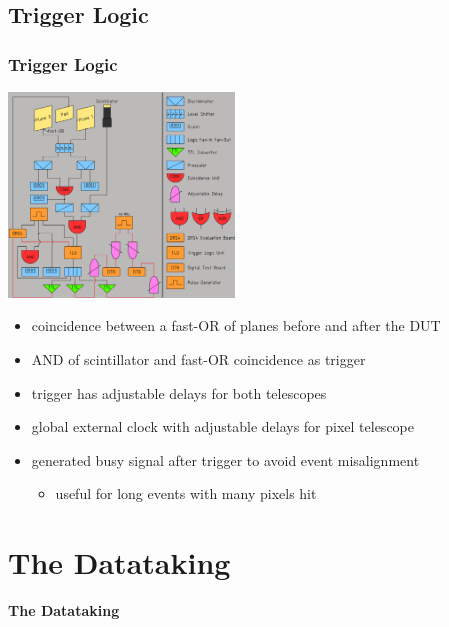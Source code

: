 \documentclass[9pt]{beamer}
\begin{document}
\subsection{Trigger Logic}
\begin{frame}
	\frametitle{Trigger Logic}
	\begin{center}
		\begin{minipage}{6cm}
			\centering
			\includegraphics[width=6cm]{Pics/triglog2}
		\end{minipage}
		\hspace*{2pt}
		\begin{minipage}{5cm}
			\begin{itemize}
				\item coincidence between a fast-OR of planes before and after the DUT
				\item AND of scintillator and fast-OR coincidence as trigger
				\item trigger has adjustable delays for both telescopes
				\item global external clock with adjustable delays for pixel telescope
				\item generated busy signal after trigger to avoid event misalignment
				\begin{itemize}
					\item useful for long events with many pixels hit 
				\end{itemize}
			\end{itemize}
		\end{minipage}\no\s
	\end{center}
\end{frame}
\section{The Datataking}
\begin{frame}
	\begin{alertblock}{
		\begin{center}
			\Large{\textbf{The Datataking}}
		\end{center}}
	\end{alertblock}
\end{frame}
\end{document}
